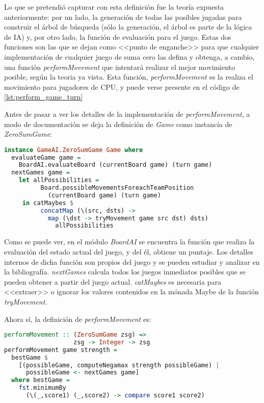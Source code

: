 \documentclass{llncs}
\begin{document}
Lo que se pretendió capturar con esta definición fue la teoría expuesta anteriormente: por un lado, la generación de todas las posibles jugadas para construir el árbol de búsqueda (sólo la generación, el árbol es parte de la lógica de IA) y, por otro lado, la función de evaluación para el juego. Estas dos funciones son las que se dejan como <<punto de enganche>> para que cualquier implementación de cualquier juego de suma cero las defina y obtenga, a cambio, una función \textit{performMovement} que intentará realizar el mejor movimiento posible, según la teoria ya vista. Esta función, \textit{performMovement} es la realiza el movimiento para jugadores de CPU, y puede verse presente en el código de \ref{lst:perform_game_turn}

Antes de pasar a ver los detalles de la implementación de \textit{performMovement}, a modo de documentación se deja la definición de \textit{Game} como instancia de \textit{ZeroSumGame}:


\begin{lstlisting}[frame=single, language=haskell, captionpos=b, caption=Definición de Game como instancia de ZeroSumGame, label={lst:zero_sum_game_instance}]
instance GameAI.ZeroSumGame Game where
  evaluateGame game =
    BoardAI.evaluateBoard (currentBoard game) (turn game)
  nextGames game =
    let allPossibilities =
          Board.possibleMovementsForeachTeamPosition
            (currentBoard game) (turn game)
     in catMaybes $
          concatMap (\(src, dsts) ->
            map (\dst -> tryMovement game src dst) dsts)
              allPossibilities
\end{lstlisting}

Como se puede ver, en el módulo \textit{BoardAI} se encuentra la función que realiza la evaluación del estado actual del juego, y del él, obtiene un puntaje. Los detalles internos de dicha función son propios del juego y se pueden estudiar y analizar en la bibliografía. \textit{nextGames} calcula todos los juegos inmediatos posibles que se pueden obtener a partir del juego actual. \textit{catMaybes} es necesaria para <<extraer>> o ignorar los valores contenidos en la mónada Maybe de la función \textit{tryMovement}.

Ahora sí, la definición de \textit{performMovement} es:

\begin{lstlisting}[frame=single, language=haskell, captionpos=b, caption=Definición de performMovement, label={lst:perform_movement}]
performMovement :: (ZeroSumGame zsg) =>
                   zsg -> Integer -> zsg
performMovement game strength =
  bestGame $
    [(possibleGame, computeNegamax strength possibleGame) |
      possibleGame <- nextGames game]
  where bestGame =
    fst.minimumBy
      (\(_,score1) (_,score2) -> compare score1 score2)
\end{lstlisting}
\end{document}
